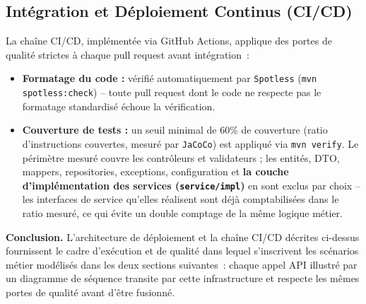 \documentclass[a4paper,12pt]{article}
\begin{document}
\begin{center}
{
}
\end{center}

\subsection{Intégration et Déploiement Continus (CI/CD)}
La chaîne CI/CD, implémentée via GitHub Actions, applique des portes de qualité strictes à chaque pull request avant intégration~:

\begin{itemize}[label=$\bullet$]
    \item \textbf{Formatage du code :} vérifié automatiquement par \texttt{Spotless} (\texttt{mvn spotless:check}) -- toute pull request dont le code ne respecte pas le formatage standardisé échoue la vérification.
    \item \textbf{Couverture de tests :} un seuil minimal de 60\% de couverture (ratio d'instructions couvertes, mesuré par \texttt{JaCoCo}) est appliqué via \texttt{mvn verify}. Le périmètre mesuré couvre les contrôleurs et validateurs ; les entités, DTO, mappers, repositories, exceptions, configuration et \textbf{la couche d'implémentation des services (\texttt{service/impl})} en sont exclus par choix -- les interfaces de service qu'elles réalisent sont déjà comptabilisées dans le ratio mesuré, ce qui évite un double comptage de la même logique métier.
\end{itemize}

\textbf{Conclusion.} L'architecture de déploiement et la chaîne CI/CD décrites ci-dessus fournissent le cadre d'exécution et de qualité dans lequel s'inscrivent les scénarios métier modélisés dans les deux sections suivantes~: chaque appel API illustré par un diagramme de séquence transite par cette infrastructure et respecte les mêmes portes de qualité avant d'être fusionné.
\end{document}
